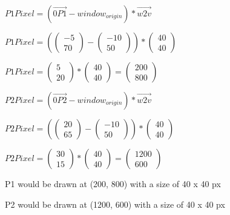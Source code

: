 $
P1Pixel
= 
\left(\vec{0P1} - window_{origin}\right) * \vec{w2v}
$

$
P1Pixel
=
\left(
    \left(\begin{array}{c}-5\\70\end{array}\right)
    -
    \left(\begin{array}{c}-10\\50\end{array}\right)
\right)
*
\left(\begin{array}{c}40\\40\end{array}\right)
$

$
P1Pixel
=
\left(\begin{array}{c}5\\20\end{array}\right)
*
\left(\begin{array}{c}40\\40\end{array}\right)
=
\left(\begin{array}{c}200\\800\end{array}\right)
$


$
P2Pixel
= 
\left(\vec{0P2} - window_{origin}\right) * \vec{w2v}
$

$
P2Pixel
=
\left(
    \left(\begin{array}{c}20\\65\end{array}\right)
    -
    \left(\begin{array}{c}-10\\50\end{array}\right)
\right)
*
\left(\begin{array}{c}40\\40\end{array}\right)
$

$
P2Pixel
=
\left(\begin{array}{c}30\\15\end{array}\right)
*
\left(\begin{array}{c}40\\40\end{array}\right)
=
\left(\begin{array}{c}1200\\600\end{array}\right)
$

P1 would be drawn at (200, 800) with a size of 40 x 40 px

P2 would be drawn at (1200, 600) with a size of 40 x 40 px